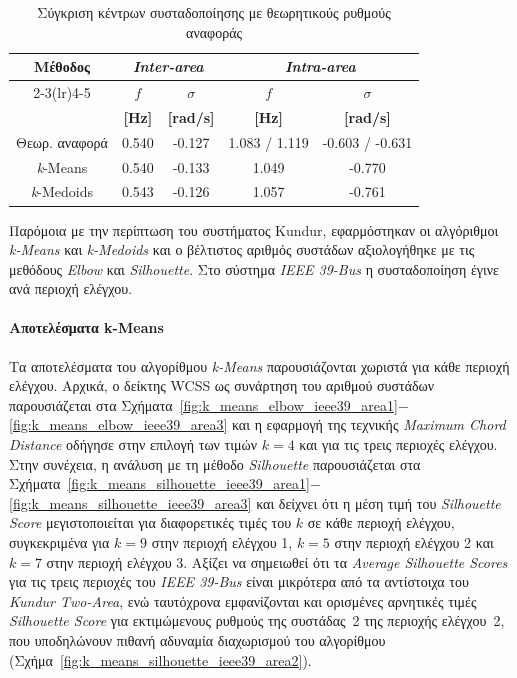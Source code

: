 \begin{table}[htbp]
\centering
\caption{Σύγκριση κέντρων συσταδοποίησης με θεωρητικούς ρυθμούς αναφοράς}
\label{tab:clustering_comparison_kundur}
\begin{tabular}{ccccc}
\toprule
\textbf{Μέθοδος} & \multicolumn{2}{c}{\textbf{\textenglish{\textit{Inter-area}}}} & \multicolumn{2}{c}{\textbf{\textenglish{\textit{Intra-area}}}} \\
\cmidrule(lr){2-3}\cmidrule(lr){4-5}
& \textbf{$f$} & \textbf{$\sigma$} & \textbf{$f$} & \textbf{$\sigma$} \\
& \textbf{[Hz]} & \textbf{[rad/s]} & \textbf{[Hz]} & \textbf{[rad/s]} \\
\midrule
Θεωρ. αναφορά & 0.540 & -0.127 & 1.083 / 1.119 & -0.603 / -0.631 \\
\textit{k}-Means   & 0.540 & -0.133 & 1.049 & -0.770 \\
\textit{k}-Medoids & 0.543 & -0.126 & 1.057 & -0.761 \\
\bottomrule
\end{tabular}
\end{table}





\else
Παρόμοια με την περίπτωση του συστήματος Kundur, εφαρμόστηκαν οι αλγόριθμοι \textenglish{\textit{k-Means}} και \textenglish{\textit{k-Medoids}} και ο βέλτιστος αριθμός συστάδων αξιολογήθηκε με τις μεθόδους \textenglish{\textit{Elbow}} και \textenglish{\textit{Silhouette}}. Στο σύστημα \textenglish{\textit{IEEE 39-Bus}} η συσταδοποίηση έγινε ανά περιοχή ελέγχου.
\paragraph{Αποτελέσματα k-Means}
Τα αποτελέσματα του αλγορίθμου \textenglish{\textit{k-Means}} παρουσιάζονται χωριστά για κάθε περιοχή ελέγχου. Αρχικά, ο δείκτης WCSS ως συνάρτηση του αριθμού συστάδων παρουσιάζεται στα Σχήματα~\ref{fig:k_means_elbow_ieee39_area1}$-$\ref{fig:k_means_elbow_ieee39_area3} και η εφαρμογή της τεχνικής \textenglish{\textit{Maximum Chord Distance}} οδήγησε στην επιλογή των τιμών $k=4$ και για τις τρεις περιοχές ελέγχου. Στην συνέχεια, η ανάλυση με τη μέθοδο \textenglish{\textit{Silhouette}} παρουσιάζεται στα Σχήματα~\ref{fig:k_means_silhouette_ieee39_area1}$-$\ref{fig:k_means_silhouette_ieee39_area3} και δείχνει ότι η μέση τιμή του \textenglish{\textit{Silhouette Score}} μεγιστοποιείται για διαφορετικές τιμές του $k$ σε κάθε περιοχή ελέγχου, συγκεκριμένα για $k=9$ στην περιοχή ελέγχου 1, $k=5$ στην περιοχή ελέγχου 2 και $k=7$ στην περιοχή ελέγχου 3. Αξίζει να σημειωθεί ότι τα \textenglish{\textit{Average Silhouette Scores}} για τις τρεις περιοχές του \textenglish{\textit{IEEE 39-Bus}} είναι μικρότερα από τα αντίστοιχα του \textenglish{\textit{Kundur Two-Area}}, ενώ ταυτόχρονα εμφανίζονται και ορισμένες αρνητικές τιμές \textenglish{\textit{Silhouette Score}} για εκτιμώμενους ρυθμούς της συστάδας~2 της περιοχής ελέγχου~2, που υποδηλώνουν πιθανή αδυναμία διαχωρισμού του αλγορίθμου (Σχήμα~\ref{fig:k_means_silhouette_ieee39_area2}).


